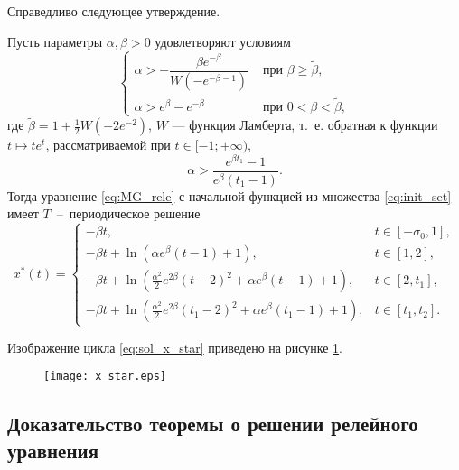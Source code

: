 Справедливо следующее утверждение.

\begin{theorem}\label{thm:relay}
Пусть параметры $\alpha,\beta>0$ удовлетворяют условиям
%
\begin{equation}
    \label{eq:cond_alpha1}
	\begin{cases}
    \alpha > -\dfrac{\beta e^{-\beta}}{W(-e^{-\beta - 1})} & \text{ при } \beta \geq \tilde{\beta},\\
	\alpha > e^{\beta} - e^{-\beta} & \text{ при } 0 < \beta < \tilde{\beta},
	\end{cases}
\end{equation}
где $\tilde{\beta} = 1 + \frac{1}{2} W(-2 e^{-2})$, $W$ --- функция Ламберта, т.~е. обратная к функции $t \mapsto te^t$, рассматриваемой при $t \in [-1; +\infty)$,
\begin{equation}
    \label{eq:cond_alpha2}
    \alpha > \dfrac{e^{\beta t_1} - 1}{e^{\beta}(t_1 - 1)}.
\end{equation}
%
Тогда уравнение \eqref{eq:MG_rele} с начальной функцией из множества \eqref{eq:init_set} имеет $T$~--~периодическое решение
\small
\begin{equation}
    \label{eq:sol_x_star}
x^*(t)= 
\begin{cases}
    -\beta t, & t\in[-\sigma_0, 1],\\
    -\beta t +\ln(\alpha e^{\beta}(t - 1)+1), & t\in[1, 2],\\
    -\beta t + \ln(\frac{\alpha^2}{2}e^{2\beta}(t - 2)^2+\alpha e^{\beta}(t - 1)+1), & t\in[2, t_1],\\
    -\beta t + \ln(\frac{\alpha^2}{2}e^{2\beta}(t_1 - 2)^2+\alpha e^{\beta}(t_1 - 1) + 1), & t\in[t_1, t_2].
\end{cases}
\end{equation}
\normalsize
\end{theorem}

Изображение цикла \eqref{eq:sol_x_star} приведено на рисунке \ref{fig:x_star:ch1}.

\begin{figure}
\centering
  \texttt{[image: x\_star.eps]}
  \label{fig:x_star:ch1}
\end{figure}


\subsection{Доказательство теоремы о решении релейного уравнения}

